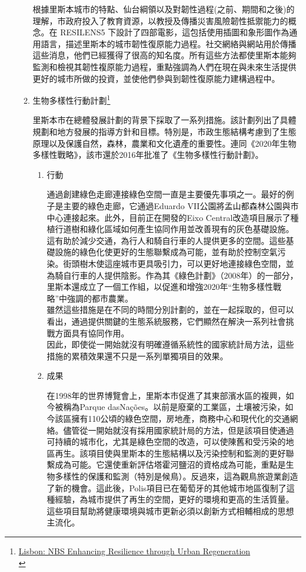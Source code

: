 \documentclass[a4paper,12pt]{article}
\begin{document}
\begin{enumerate}
\begin{enumerate}
根據里斯本城市的特點、仙台綱領以及對韌性過程(之前、期間和之後)的理解，市政府投入了教育資源，以教授及傳播災害風險韌性抵禦能力的概念。在 RESILENS5 下設計了四部電影，這包括使用插圖和象形圖作為通用語言，描述里斯本的城市韌性復原能力過程。社交網絡與網站用於傳播這些消息，他們已經獲得了很高的知名度。所有這些方法都使里斯本能夠監測和檢視其韌性複原能力過程，重點強調為人們在現在與未來生活提供更好的城市所做的投資，並使他們參與到韌性復原能力建構過程中。\\
\item 生物多樣性行動計劃\footnote{\href{https://oppla.eu/casestudy/19462}{Lisbon: NBS Enhancing Resilience through Urban Regeneration}\\}
\label{sec:orgdcfa8d9}

里斯本市在總體發展計劃的背景下採取了一系列措施。該計劃列出了具體規劃和地方發展的指導方針和目標。特別是，市政生態結構考慮到了生態原理以及保護自然，森林，農業和文化遺產的重要性。連同《2020年生物多樣性戰略》，該市還於2016年批准了《生物多樣性行動計劃》。\\
\begin{enumerate}
\item 行動
\label{sec:org9a81885}

通過創建綠色走廊連接綠色空間一直是主要優先事項之一。最好的例子是主要的綠色走廊，它通過Eduardo VII公園將孟山都森林公園與市中心連接起來。此外，目前正在開發的Eixo Central改造項目展示了種植行道樹和綠化區域如何產生協同作用並改善現有的灰色基礎設施。這有助於減少交通，為行人和騎自行車的人提供更多的空間。這些基礎設施的綠色化使更好的生態聯繫成為可能，並有助於控制空氣污染。街頭樹木使這座城市更具吸引力，可以更好地連接綠色空間，並為騎自行車的人提供陰影。作為其《綠色計劃》（2008年）的一部分，里斯本還成立了一個工作組，以促進和增強2020年“生物多樣性戰略”中強調的都市農業。\\

雖然這些措施是在不同的時間分別計劃的，並在一起採取的，但可以看出，通過提供關鍵的生態系統服務，它們顯然在解決一系列社會挑戰方面具有協同作用。\\

因此，即使從一開始就沒有明確遵循系統性的國家統計局方法，這些措施的累積效果還不只是一系列單獨項目的效果。\\
\item 成果
\label{sec:org02c61b4}

在1998年的世界博覽會上，里斯本市促進了其東部濱水區的複興，如今被稱為Parque dasNações。以前是廢棄的工業區，土壤被污染，如今該區擁有110公頃的綠色空間，房地產，商務中心和現代化的交通網絡。儘管從一開始就沒有採用國家統計局的方法，但是該項目使通過可持續的城市化，尤其是綠色空間的改造，可以使陳舊和受污染的地區再生。該項目使與里斯本的生態結構以及污染控制和監測的更好聯繫成為可能。它還使重新評估塔霍河鹽沼的資格成為可能，重點是生物多樣性的保護和監測（特別是候鳥）。反過來，這為觀鳥旅遊業創造了新的機會。這此後，Polis項目已在葡萄牙的其他城市地區復制了這種經驗，為城市提供了再生的空間，更好的環境和更高的生活質量。這些項目幫助將健康環境與城市更新必須以創新方式相輔相成的思想主流化。\\


\end{enumerate}
\end{enumerate}
\end{enumerate}
\end{document}
